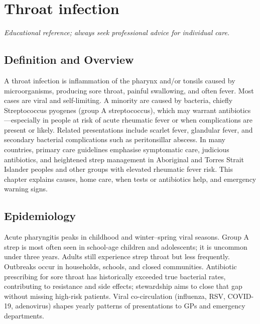 \chapter{Throat infection}

\medskip
\noindent\textit{Educational reference; always seek professional advice for individual care.}

\section*{Definition and Overview}
A throat infection is inflammation of the pharynx and/or tonsils caused by microorganisms, producing sore throat, painful swallowing, and often fever. Most cases are viral and self-limiting. A minority are caused by bacteria, chiefly Streptococcus pyogenes (group A streptococcus), which may warrant antibiotics---especially in people at risk of acute rheumatic fever or when complications are present or likely. Related presentations include scarlet fever, glandular fever, and secondary bacterial complications such as peritonsillar abscess. In many countries, primary care guidelines emphasise symptomatic care, judicious antibiotics, and heightened strep management in Aboriginal and Torres Strait Islander peoples and other groups with elevated rheumatic fever risk. This chapter explains causes, home care, when tests or antibiotics help, and emergency warning signs.

\section*{Epidemiology}
Acute pharyngitis peaks in childhood and winter--spring viral seasons. Group A strep is most often seen in school-age children and adolescents; it is uncommon under three years. Adults still experience strep throat but less frequently. Outbreaks occur in households, schools, and closed communities. Antibiotic prescribing for sore throat has historically exceeded true bacterial rates, contributing to resistance and side effects; stewardship aims to close that gap without missing high-risk patients. Viral co-circulation (influenza, RSV, COVID-19, adenovirus) shapes yearly patterns of presentations to GPs and emergency departments.

